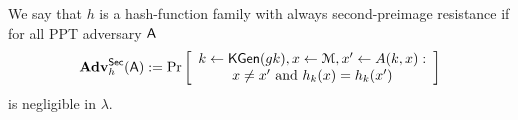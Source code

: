 \begin{definition}\label{def:hash2}
 We say that $h$ is a hash-function family with always second-preimage resistance if for all PPT adversary $\mathsf{A}$
$$
\mathbf{Adv}_h^{\mathsf{Sec}}(\mathsf{A}) := \Pr\left[\begin{array}{c}
k\gets\mathsf{KGen}(gk), x\gets\mathcal{M}, x'\gets A(k,x):\\
 x\neq x'\text{ and }h_k(x)=h_k(x')
 \end{array}\right]
$$ 
is negligible in $\lambda$.
\end{definition}
%
